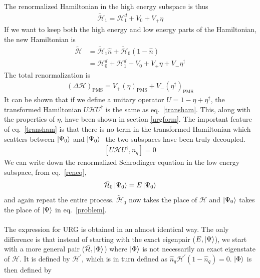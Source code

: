 \documentclass[twoside,11pt]{report}
\numberwithin{equation}{section}
\begin{document}
The renormalized Hamiltonian in the high energy subspace is thus
\begin{equation}\begin{aligned}
	\tilde{\mathcal{H}}_1 = \mathcal{H}^d_1 + V_0 + V_+ \eta
\end{aligned}\end{equation}
If we want to keep both the high energy and low energy parts of the Hamiltonian, the new Hamiltonian is
\begin{equation}\begin{aligned}
	\label{transham}
	\tilde{\mathcal{H}} &= \tilde{\mathcal{H}}_1 \hat n + \tilde{\mathcal{H}}_0 \left(1 - \hat n\right)\\
&= \mathcal{H}^d_0 + \mathcal{H}^d_1 + V_0 + V_+ \eta + V_- \eta^\dagger
\end{aligned}\end{equation}
The total renormalization is
\begin{equation}\begin{aligned}
	\left(\Delta \mathcal{H}\right)_\text{PMS} = V_+ \left(\eta\right)_\text{PMS} + V_- \left(\eta^\dagger\right)_\text{PMS}
\end{aligned}\end{equation}
It can be shown that if we define a unitary operator \(U = 1 - \eta + \eta^\dagger\), the transformed Hamiltonian \(U \mathcal{H} U^\dagger\) is the same as eq.~\ref{transham}. This, along with the properties of \(\eta\), have been shown in section \ref{urgform}. The important feature of eq.~\ref{transham} is that there is no term in the transformed Hamiltonian which scatters between \(\ket{\Psi_0}\) and \(\ket{\Psi_0}\)- the two subspaces have been truly decoupled.
\begin{equation}\begin{aligned}
	\left[U \mathcal{H} U^\dagger, n_q\right] = 0
\end{aligned}\end{equation}
We can write down the renormalized Schrodinger equation in the low energy subspace, from eq.~\ref{reneq},
\begin{equation}\begin{aligned}
	\tilde{\mathcal{H}}_0 \ket{\Psi_0} = E\ket{\Psi_0}
\end{aligned}\end{equation}
and again repeat the entire process. \(\tilde{\mathcal{H}}_0\) now takes the place of \(\mathcal{H}\) and \(\ket{\Psi_0}\) takes the place of \(\ket{\Psi}\) in eq.~\ref{problem}.
\\\\The expression for URG is obtained in an almost identical way. The only difference is that instead of starting with the exact eigenpair (\(E,\ket{\Psi}\)), we start with a more general pair (\(\tilde{\mathcal{H}}, \ket{\Phi}\)) where \(\ket{\Phi}\) is not necessarily an exact eigenstate of \(\mathcal{H}\). It is defined by \(\mathcal{H}^\prime\), which is in turn defined as \(\hat n_q \mathcal{H}^\prime\left(1 - \hat n_q\right) = 0\). \(\ket{\Phi}\) is then defined by
\end{document}
